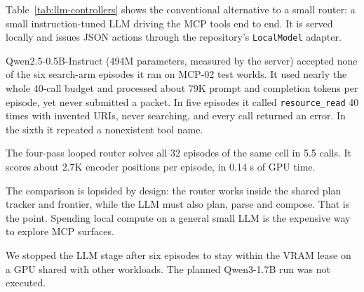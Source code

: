 Table~\ref{tab:llm-controllers} shows the conventional alternative to a small router: a small instruction-tuned LLM
driving the MCP tools end to end. It is served locally and issues JSON actions through the repository's
\texttt{LocalModel} adapter.

Qwen2.5-0.5B-Instruct (494M parameters, measured by the server) accepted none of the six search-arm episodes it ran
on MCP-02 test worlds. It used nearly the whole 40-call budget and processed about 79K prompt and completion tokens
per episode, yet never submitted a packet. In five episodes it called \texttt{resource\_read} 40 times with invented
URIs, never searching, and every call returned an error. In the sixth it repeated a nonexistent tool name.

The four-pass looped router solves all 32 episodes of the same cell in 5.5 calls. It scores about 2.7K encoder
positions per episode, in 0.14 s of GPU time.

The comparison is lopsided by design: the router works inside the shared plan tracker and frontier, while the LLM
must also plan, parse and compose. That is the point. Spending local compute on a general small LLM is the
expensive way to explore MCP surfaces.

We stopped the LLM stage after six episodes to stay within the VRAM lease on a GPU shared with other workloads. The
planned Qwen3-1.7B run was not executed.

